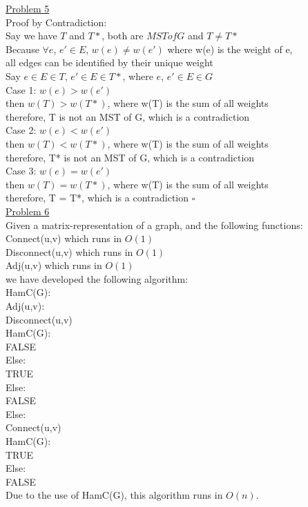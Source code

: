\documentclass[a4paper,12pt]{article}
\begin{document}
\underline{Problem 5}\\
\indent Proof by Contradiction:\\
\indent Say we have $T$ and $T*$, both are $MST of G$ and $T \neq T*$\\
\indent Because $\forall e$, $e' \in E$, $w(e) \neq w(e')$ where w(e) is the weight of e,\\ 
\indent all edges can be identified by their unique weight\\
\indent Say $e \in E \in T$, $e' \in E \in T*$, where $e$, $e' \in E \in G$\\
\indent \indent Case 1: $w(e) > w(e')$\\
\indent\indent\indent then $w(T) > w(T*)$, where w(T) is the sum of all weights\\
\indent\indent\indent therefore, T is not an MST of G, which is a contradiction\\
\indent \indent Case 2: $w(e) < w(e')$\\
\indent\indent\indent then $w(T) < w(T*)$, where w(T) is the sum of all weights\\
\indent\indent\indent therefore, T* is not an MST of G, which is a contradiction\\
\indent \indent Case 3: $w(e) = w(e')$\\
\indent\indent\indent then $w(T) = w(T*)$, where w(T) is the sum of all weights\\
\indent\indent\indent therefore, T = T*, which is a contradiction $\square$\\ 

\underline{Problem 6}\\
\indent Given a matrix-representation of a graph, and the following functions: 
\indent \indent Connect(u,v) which runs in $O(1)$\\
\indent \indent Disconnect(u,v) which runs in $O(1)$\\
\indent \indent Adj(u,v) which runs in $O(1)$\\ 
\indent we have developed the following algorithm:\\

HamC(G):\\
\indent \indent Adj(u,v):\\
\indent \indent \indent Disconnect(u,v)\\
\indent \indent \indent HamC(G):\\
\indent \indent \indent \indent FALSE\\
\indent \indent \indent Else:\\
\indent \indent \indent \indent TRUE\\
\indent \indent Else:\\
\indent \indent \indent FALSE\\
\indent Else:\\
\indent  \indent Connect(u,v)\\
\indent \indent HamC(G):\\
\indent \indent \indent TRUE\\
\indent \indent Else:\\
\indent \indent \indent FALSE\\

Due to the use of HamC(G), this algorithm runs in $O(n)$.\\
\end{document}
